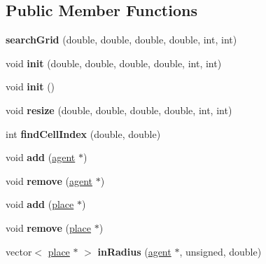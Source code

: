 \subsection*{Public Member Functions}
\begin{DoxyCompactItemize}
\item 
\mbox{\label{classsearchGrid_ae0a6729cbd7805277ffcb564b4a944ff}} 
{\bfseries search\+Grid} (double, double, double, double, int, int)
\item 
\mbox{\label{classsearchGrid_a884869df22304cc7de918b036b35e4cf}} 
void {\bfseries init} (double, double, double, double, int, int)
\item 
\mbox{\label{classsearchGrid_afe43b4b153b6eabbba15e9eb4cc4bcce}} 
void {\bfseries init} ()
\item 
\mbox{\label{classsearchGrid_a1dc5fd0533064d865f2ad0fcd4803f7c}} 
void {\bfseries resize} (double, double, double, double, int, int)
\item 
\mbox{\label{classsearchGrid_a25942068c892186e3000e219e28ef7f1}} 
int {\bfseries find\+Cell\+Index} (double, double)
\item 
\mbox{\label{classsearchGrid_accff7a0116d833e45b7b70e56768b2ab}} 
void {\bfseries add} (\mbox{\hyperlink{classagent}{agent}} $\ast$)
\item 
\mbox{\label{classsearchGrid_a866061b0de28991376b91c12b92300e5}} 
void {\bfseries remove} (\mbox{\hyperlink{classagent}{agent}} $\ast$)
\item 
\mbox{\label{classsearchGrid_a58b0b4ced44c2a9585f2fe5d130c15d5}} 
void {\bfseries add} (\mbox{\hyperlink{classplace}{place}} $\ast$)
\item 
\mbox{\label{classsearchGrid_a183584d811404b032cd6eca009100bce}} 
void {\bfseries remove} (\mbox{\hyperlink{classplace}{place}} $\ast$)
\item 
\mbox{\label{classsearchGrid_a1658b9e34fe5af92cf5370fbd8283a85}} 
vector$<$ \mbox{\hyperlink{classplace}{place}} $\ast$ $>$ {\bfseries in\+Radius} (\mbox{\hyperlink{classagent}{agent}} $\ast$, unsigned, double)

\end{DoxyCompactItemize}
